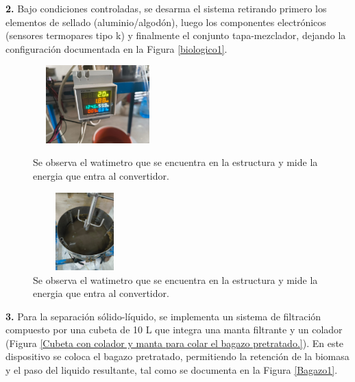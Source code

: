 \documentclass[12pt]{article}
\begin{document}
			
			\textbf{2.} Bajo condiciones controladas, se desarma el sistema retirando primero los elementos de sellado (aluminio/algodón), luego los componentes electrónicos (sensores termopares tipo k) y finalmente el conjunto tapa-mezclador, dejando la configuración documentada en la Figura \ref{biologico1}.
	
			
					
			\begin{figure}[H]
				\centering
				\begin{minipage}{0.46\textwidth}
					\centering
					\includegraphics[width=5cm, height=3cm]{imagenes/watimetro} %
					\caption{Se observa el watimetro que se encuentra en la estructura y mide la energia que entra al convertidor.}
						\label{watimetro}
					\end{minipage}
					\hfill
					\begin{minipage}{0.48\textwidth}
						\centering
						\includegraphics[width=4cm, height=3cm]{imagenes/biologico1} %
						\caption{Se observa el watimetro que se encuentra en la estructura y mide la energia que entra al convertidor.}
						\label{biologico1r}
					\end{minipage}
				\end{figure}
				
			
			\textbf{3.} Para la separación sólido-líquido, se implementa un sistema de filtración compuesto por una cubeta de 10 L que integra una manta filtrante y un colador (Figura \ref{Cubeta con colador y manta para colar el bagazo pretratado.}). En este dispositivo se coloca el bagazo pretratado, permitiendo la retención de la biomasa y el paso del liquido resultante, tal como se documenta en la Figura \ref{Bagazo1}.
 
\end{document}
